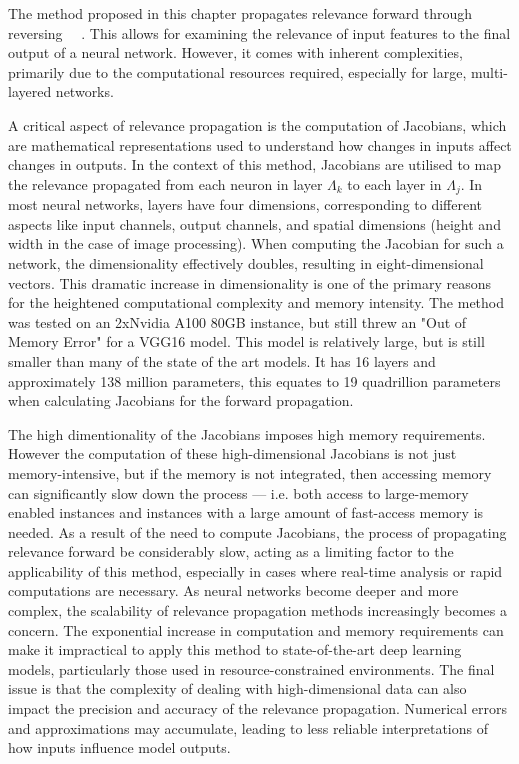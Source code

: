 The method proposed in this chapter propagates relevance forward through reversing \LRP\ ~\cite{bach2015pixel}. This allows for examining the relevance of input features to the final output of a neural network. However, it comes with inherent complexities, primarily due to the computational resources required, especially for large, multi-layered networks.

A critical aspect of relevance propagation is the computation of Jacobians, which are mathematical representations used to understand how changes in inputs affect changes in outputs. In the context of this method, Jacobians are utilised to map the relevance propagated from each neuron in layer $\Lambda_k$ to each layer in $\Lambda_j$. In most neural networks, layers have four dimensions, corresponding to different aspects like input channels, output channels, and spatial dimensions (height and width in the case of image processing). When computing the Jacobian for such a network, the dimensionality effectively doubles, resulting in eight-dimensional vectors. This dramatic increase in dimensionality is one of the primary reasons for the heightened computational complexity and memory intensity. The method was tested on an 2xNvidia A100 80GB instance, but still threw an "Out of Memory Error" for a VGG16 model. This model is relatively large, but is still smaller than many of the state of the art models. It has 16 layers and approximately 138 million parameters, this equates to 19 quadrillion parameters when calculating Jacobians for the forward propagation. 


The high dimentionality of the Jacobians imposes high memory requirements. However the computation of these high-dimensional Jacobians is not just memory-intensive, but if the memory is not integrated, then accessing memory can significantly slow down the process --- i.e. both access to large-memory enabled instances and instances with a large amount of fast-access memory is needed. As a result of the need to compute Jacobians, the process of propagating relevance forward be considerably slow, acting as a limiting factor to the applicability of this method, especially in cases where real-time analysis or rapid computations are necessary. As neural networks become deeper and more complex, the scalability of relevance propagation methods increasingly becomes a concern. The exponential increase in computation and memory requirements can make it impractical to apply this method to state-of-the-art deep learning models, particularly those used in resource-constrained environments. The final issue is that the complexity of dealing with high-dimensional data can also impact the precision and accuracy of the relevance propagation. Numerical errors and approximations may accumulate, leading to less reliable interpretations of how inputs influence model outputs. 

